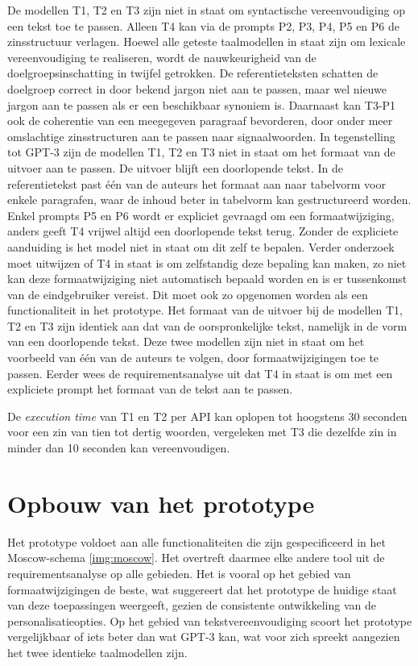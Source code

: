\medspace

De modellen T1, T2 en T3 zijn niet in staat om syntactische vereenvoudiging op een tekst toe te passen. Alleen T4 kan via de prompts P2, P3, P4, P5 en P6 de zinsstructuur verlagen. Hoewel alle geteste taalmodellen in staat zijn om lexicale vereenvoudiging te realiseren, wordt de nauwkeurigheid van de doelgroepsinschatting in twijfel getrokken. De referentieteksten schatten de doelgroep correct in door bekend jargon niet aan te passen, maar wel nieuwe jargon aan te passen als er een beschikbaar synoniem is.  Daarnaast kan T3-P1 ook de coherentie van een meegegeven paragraaf bevorderen, door onder meer omslachtige zinsstructuren aan te passen naar signaalwoorden. In tegenstelling tot GPT-3 zijn de modellen T1, T2 en T3 niet in staat om het formaat van de uitvoer aan te passen. De uitvoer blijft een doorlopende tekst. In de referentietekst past één van de auteurs het formaat aan naar tabelvorm voor enkele paragrafen, waar de inhoud beter in tabelvorm kan gestructureerd worden. Enkel prompts P5 en P6 wordt er expliciet gevraagd om een formaatwijziging, anders geeft T4 vrijwel altijd een doorlopende tekst terug. Zonder de expliciete aanduiding is het model niet in staat om dit zelf te bepalen. Verder onderzoek moet uitwijzen of T4 in staat is om zelfstandig deze bepaling kan maken, zo niet kan deze formaatwijziging niet automatisch bepaald worden en is er tussenkomst van de eindgebruiker vereist. Dit moet ook zo opgenomen worden als een functionaliteit in het prototype. Het formaat van de uitvoer bij de modellen T1, T2 en T3 zijn identiek aan dat van de oorspronkelijke tekst, namelijk in de vorm van een doorlopende tekst. Deze twee modellen zijn niet in staat om het voorbeeld van één van de auteurs te volgen, door formaatwijzigingen toe te passen. Eerder wees de requirementsanalyse uit dat T4 in staat is om met een expliciete prompt het formaat van de tekst aan te passen.

\medspace

De \textit{execution time} van T1 en T2 per API kan oplopen tot hoogstens 30 seconden voor een zin van tien tot dertig woorden, vergeleken met T3 die dezelfde zin in minder dan 10 seconden kan vereenvoudigen.

\section{Opbouw van het prototype}

Het prototype voldoet aan alle functionaliteiten die zijn gespecificeerd in het Moscow-schema \ref{img:moscow}. Het overtreft daarmee elke andere tool uit de requirementsanalyse op alle gebieden. Het is vooral op het gebied van formaatwijzigingen de beste, wat suggereert dat het prototype de huidige staat van deze toepassingen weergeeft, gezien de consistente ontwikkeling van de personalisatieopties. Op het gebied van tekstvereenvoudiging scoort het prototype vergelijkbaar of iets beter dan wat GPT-3 kan, wat voor zich spreekt aangezien het twee identieke taalmodellen zijn.

